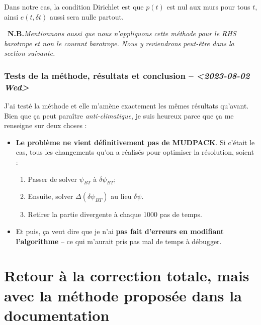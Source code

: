\documentclass[10pt]{article}
\numberwithin{equation}{section}
\newcommand{\nb}{\ding{165}\ \textbf{N.B.}\hspace{4pt}}
\begin{document}
Dans notre cas, la condition Dirichlet est que \(p(t)\) est nul aux murs pour tous \(t\), ainsi \(e(t,\delta t)\) aussi sera nulle partout.\bigskip

\nb \emph{Mentionnons aussi que nous n'appliquons cette méthode pour le RHS barotrope et non le courant barotrope. Nous y reviendrons peut-être dans la section suivante.}

\subsubsection{Tests de la méthode, résultats et conclusion -- \textit{<2023-08-02 Wed>}}
\label{sec:orgde89c94}
J'ai testé la méthode et elle m'amène exactement les mêmes résultats qu'avant.
Bien que ça peut paraître \emph{anti-climatique}, je suis heureux parce que ça me renseigne sur deux choses :
\begin{itemize}
\item \textbf{Le problème ne vient définitivement pas de MUDPACK}.
Si c'était le cas, tous les changements qu'on a réalisés pour optimiser la résolution, soient :
\begin{enumerate}
\item Passer de solver \(\psi_{BT}\) à \(\delta \psi_{BT}\);
\item Ensuite, solver \(\Delta (\delta \psi_{BT})\) au lieu \(\delta\psi\).
\item Retirer la partie divergente à chaque 1000 pas de temps.
\end{enumerate}

\item Et puis, ça veut dire que je n'ai \textbf{pas fait d'erreurs en modifiant l'algorithme} -- ce qui m'aurait pris pas mal de temps à débugger.
\end{itemize}


\section{Retour à la correction totale, mais avec la méthode proposée dans la documentation}
\label{sec:org28f8288}
\end{document}
